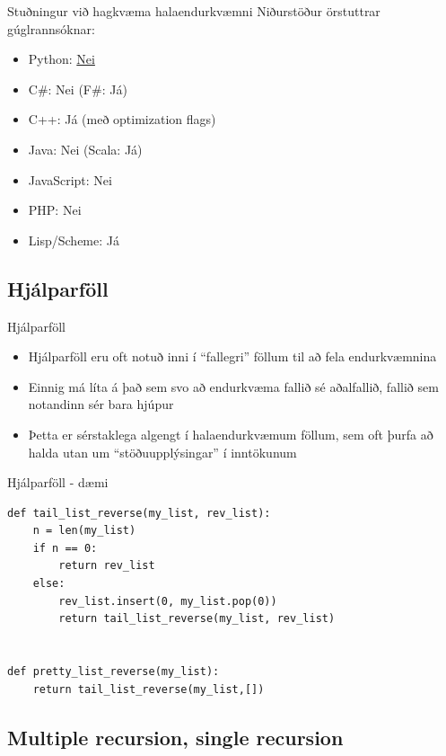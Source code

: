 \documentclass[handout]{beamer}
\begin{document}
\begin{frame}{Stuðningur við hagkvæma halaendurkvæmni}
Niðurstöður örstuttrar gúglrannsóknar:
\begin{itemize}
 \item Python: \href{http://neopythonic.blogspot.com/2009/04/tail-recursion-elimination.html}{Nei}
 \item C\#: Nei (F\#: Já)
 \item C++: Já (með optimization flags)
 \item Java: Nei (Scala: Já)
 \item JavaScript: Nei
 \item PHP: Nei
 \item Lisp/Scheme: Já
\end{itemize}
\end{frame}

\subsection{Hjálparföll}
\begin{frame}{Hjálparföll}
\begin{itemize}
 \item Hjálparföll eru oft notuð inni í ``fallegri'' föllum til að fela endurkvæmnina
 \item Einnig má líta á það sem svo að endurkvæma fallið sé aðalfallið, fallið sem notandinn sér bara hjúpur
 \item Þetta er sérstaklega algengt í halaendurkvæmum föllum, sem oft þurfa að halda utan um ``stöðuupplýsingar'' í inntökunum
\end{itemize}
\end{frame}

\begin{frame}[fragile]{Hjálparföll - dæmi}
\begin{verbatim}
def tail_list_reverse(my_list, rev_list):
    n = len(my_list)
    if n == 0:
        return rev_list
    else:
        rev_list.insert(0, my_list.pop(0))
        return tail_list_reverse(my_list, rev_list)


def pretty_list_reverse(my_list):
    return tail_list_reverse(my_list,[])
\end{verbatim}
\end{frame}


\subsection{Multiple recursion, single recursion}
\end{document}
